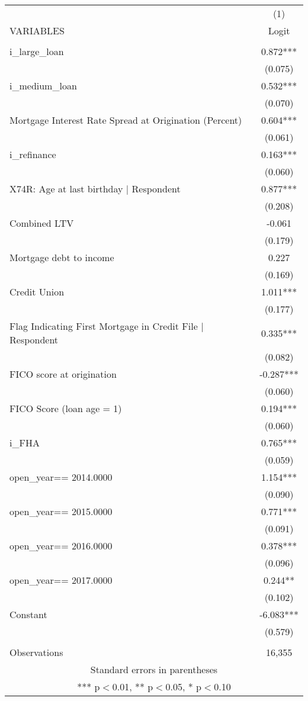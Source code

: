 \begin{tabular}{lc} \hline
 & (1) \\
VARIABLES & Logit \\ \hline
 &  \\
i\_large\_loan & 0.872*** \\
 & (0.075) \\
i\_medium\_loan & 0.532*** \\
 & (0.070) \\
Mortgage Interest Rate Spread at Origination (Percent) & 0.604*** \\
 & (0.061) \\
i\_refinance & 0.163*** \\
 & (0.060) \\
X74R: Age at last birthday | Respondent & 0.877*** \\
 & (0.208) \\
Combined LTV & -0.061 \\
 & (0.179) \\
Mortgage debt to income & 0.227 \\
 & (0.169) \\
Credit Union & 1.011*** \\
 & (0.177) \\
Flag Indicating First Mortgage in Credit File | Respondent & 0.335*** \\
 & (0.082) \\
FICO score at origination & -0.287*** \\
 & (0.060) \\
FICO Score (loan age = 1) & 0.194*** \\
 & (0.060) \\
i\_FHA & 0.765*** \\
 & (0.059) \\
open\_year==  2014.0000 & 1.154*** \\
 & (0.090) \\
open\_year==  2015.0000 & 0.771*** \\
 & (0.091) \\
open\_year==  2016.0000 & 0.378*** \\
 & (0.096) \\
open\_year==  2017.0000 & 0.244** \\
 & (0.102) \\
Constant & -6.083*** \\
 & (0.579) \\
 &  \\
 Observations & 16,355 \\ \hline
\multicolumn{2}{c}{ Standard errors in parentheses} \\
\multicolumn{2}{c}{ *** p$<$0.01, ** p$<$0.05, * p$<$0.10} \\
\end{tabular}

